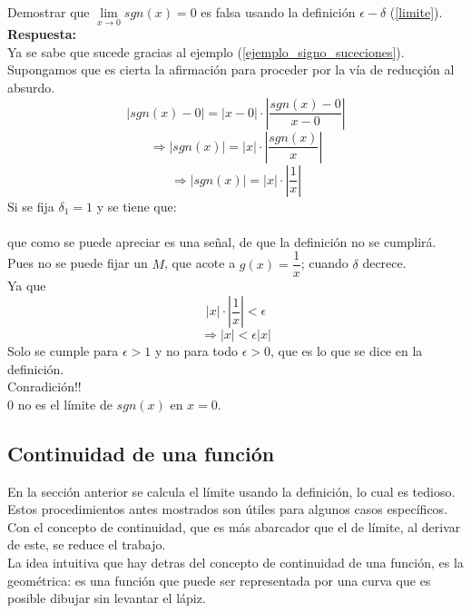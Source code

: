 \documentclass[10pt,twoside]{SelfArx} %
\begin{document}
\begin{ejemplo}
	Demostrar que $ \lim\limits_{x\rightarrow0}sgn(x)=0 $ es falsa usando la definici\'on $ \epsilon-\delta
	 $ (\ref{limite}).\\
	 \textbf{Respuesta:}\\
	 Ya se sabe que sucede gracias al ejemplo (\ref{ejemplo_signo_suceciones}). Supongamos que es cierta la afirmaci\'on para proceder por la vía de reducçión al absurdo.
	 \[ |sgn(x)-0|=|x-0|\cdot\left |\dfrac{sgn(x)-0}{x-0}\right |\]
	  \[ \Rightarrow |sgn(x)|=|x|\cdot\left |\dfrac{sgn(x)}{x}\right |\]
	  \[  \Rightarrow |sgn(x)|=|x|\cdot\left |\dfrac{1}{x}\right | \]
	  Si se fija $ \delta_{1}=1 $ y se tiene que:\\
	  
	  \\
	  que como se puede apreciar es una  señal, de que la definición no se cumplirá. Pues no se puede fijar un $ M $, que acote a $ g(x)=\dfrac{1}{x} $; cuando $ \delta 
	   $ decrece.\\
Ya que 	  
	  \[ |x|\cdot\left |\dfrac{1}{x}\right |<\epsilon \]
	  \[\Rightarrow |x|<\epsilon|x| \]
Solo se cumple para $ \epsilon>1 $ y no para todo $ \epsilon>0 $, que es lo que se dice en la definición.\\ Conradición!!\\
$ 0 $ no es el límite de $ sgn(x) $ en $ x=0 $.
\end{ejemplo}






\subsection{Continuidad de una funci\'on}

En la secci\'on anterior se calcula el límite usando la definición, lo cual es tedioso. Estos procedimientos antes mostrados son útiles para algunos casos específicos. Con el concepto de continuidad, que es más abarcador que el de límite, al derivar de este, se reduce el trabajo.\\
La idea intuitiva que hay detras del concepto de continuidad de una funci\'on, es la geométrica: es una función que puede ser representada por una curva que es posible dibujar sin levantar el lápiz.
\end{document}
